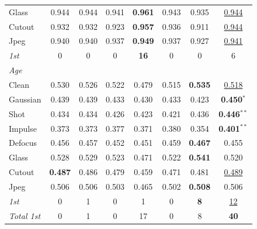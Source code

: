 \begin{table}[htbp]
\begin{tabular}{lccccccc}
Glass      & 0.944 & 0.944 & 0.941 & \textbf{0.961} & 0.943 & 0.935 & \underline{0.944} \\
Cutout     & 0.932 & 0.932 & 0.923 & \textbf{0.957} & 0.936 & 0.911 & \underline{0.944} \\
Jpeg       & 0.940 & 0.940 & 0.937 & \textbf{0.949} & 0.937 & 0.927 & \underline{0.941} \\
\textit{1st} & 0 & 0 & 0 & \textbf{16} & 0 & 0 & 6 \\
\midrule
\multicolumn{8}{l}{\textit{Age}} \\
Clean      & 0.530 & 0.526 & 0.522 & 0.479 & 0.515 & \textbf{0.535} & \underline{0.518} \\
Gaussian   & 0.439 & 0.439 & 0.433 & 0.430 & 0.433 & 0.423 & \textbf{0.450}$^{*}$ \\
Shot       & 0.434 & 0.434 & 0.426 & 0.423 & 0.421 & 0.436 & \textbf{0.446}$^{**}$ \\
Impulse    & 0.373 & 0.373 & 0.377 & 0.371 & 0.380 & 0.354 & \textbf{0.401}$^{**}$ \\
Defocus    & 0.456 & 0.457 & 0.452 & 0.451 & 0.459 & \textbf{0.467} & 0.455 \\
Glass      & 0.528 & 0.529 & 0.523 & 0.471 & 0.522 & \textbf{0.541} & 0.520 \\
Cutout     & \textbf{0.487} & 0.486 & 0.479 & 0.459 & 0.471 & 0.481 & \underline{0.489} \\
Jpeg       & 0.506 & 0.506 & 0.503 & 0.465 & 0.502 & \textbf{0.508} & 0.506 \\
\textit{1st} & 0 & 1 & 0 & 1 & 0 & \textbf{8} & \underline{12} \\
\textit{Total 1st} & 0 & 1 & 0 & 17 & 0 & 8 & \textbf{40} \\
\bottomrule
\end{tabular}
\end{table}


